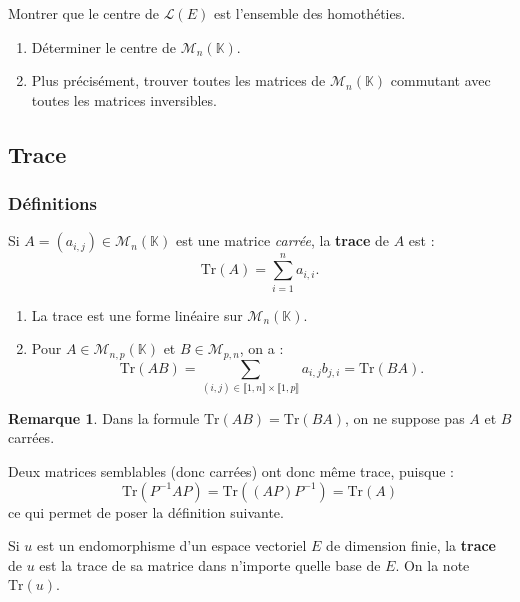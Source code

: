 \documentclass[french]{article}
\newcommand{\K}{\mathbb{K}}
\newcommand{\inv}{^{-1}}
\newcommand{\Tr}{\text{Tr}}
\theoremstyle{plain}
\theoremstyle{definition}
\newtheorem*{rmq}{Remarque}
\theoremstyle{remark}
\begin{document}
\begin{exo}
	Montrer que le centre de $\mathcal{L}(E)$ est l'ensemble des homothéties.
\end{exo}

\begin{exo}
	\begin{enumerate}
		\item Déterminer le centre de $\mathcal{M}_n(\K)$. %
		\item Plus précisément, trouver toutes les matrices de $\mathcal{M}_n(\K)$ commutant avec toutes les matrices inversibles.
	\end{enumerate}
\end{exo}

\subsection{Trace}

\subsubsection*{Définitions}

\begin{dfn}
	Si $A=(a_{i,j})\in\mathcal{M}_n(\K)$ est une matrice \textit{carrée}, la \textbf{trace} de $A$ est :
	$$\Tr(A)=\sum_{i=1}^{n}a_{i,i}.$$
\end{dfn}

\begin{prop}%
	\begin{enumerate}
		\item La trace est une forme linéaire sur $\mathcal{M}_n(\K)$.
		\item Pour $A\in\mathcal{M}_{n,p}(\K)$ et $B\in\mathcal{M}_{p,n}$, on a :
		$$\Tr(AB)=\sum_{(i,j)\in\llbracket1,n\rrbracket\times\llbracket1,p\rrbracket}a_{i,j}b_{j,i}=\Tr(BA).$$
	\end{enumerate}
\end{prop}

\begin{rmq}
	Dans la formule $\Tr(AB)=\Tr(BA)$, on ne suppose pas $A$ et $B$ carrées.
\end{rmq}

Deux matrices semblables (donc carrées) ont donc même trace, puisque :
$$\Tr(P\inv AP)=\Tr((AP)P\inv)=\Tr(A)$$ ce qui permet de poser la définition suivante.

\begin{dfn}
	Si $u$ est un endomorphisme d'un espace vectoriel $E$ de dimension finie, la \textbf{trace} de $u$ est la trace de sa matrice dans n'importe quelle base de $E$. On la note $\Tr(u)$.
\end{dfn}
\end{document}
